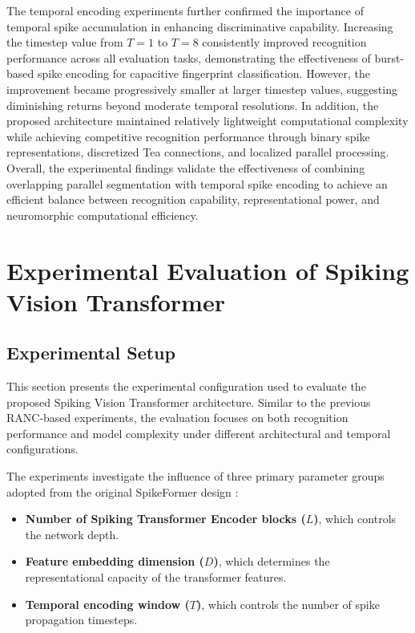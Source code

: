 \documentclass[../main.tex]{subfiles}
\begin{document}
The temporal encoding experiments further confirmed the importance of temporal spike accumulation in enhancing discriminative capability. Increasing the timestep value from \(T=1\) to \(T=8\) consistently improved recognition performance across all evaluation tasks, demonstrating the effectiveness of burst-based spike encoding for capacitive fingerprint classification. However, the improvement became progressively smaller at larger timestep values, suggesting diminishing returns beyond moderate temporal resolutions. In addition, the proposed architecture maintained relatively lightweight computational complexity while achieving competitive recognition performance through binary spike representations, discretized Tea connections, and localized parallel processing. Overall, the experimental findings validate the effectiveness of combining overlapping parallel segmentation with temporal spike encoding to achieve an efficient balance between recognition capability, representational power, and neuromorphic computational efficiency.

\section{Experimental Evaluation of Spiking Vision Transformer}

\subsection{Experimental Setup}

This section presents the experimental configuration used to evaluate the proposed Spiking Vision Transformer architecture. Similar to the previous RANC-based experiments, the evaluation focuses on both recognition performance and model complexity under different architectural and temporal configurations.

The experiments investigate the influence of three primary parameter groups adopted from the original SpikeFormer design \cite{zhou2023spikeformer}:

\begin{itemize}
    \item \textbf{Number of Spiking Transformer Encoder blocks (\(L\))}, which controls the network depth.
    
    \item \textbf{Feature embedding dimension (\(D\))}, which determines the representational capacity of the transformer features.
    
    \item \textbf{Temporal encoding window (\(T\))}, which controls the number of spike propagation timesteps.
\end{itemize}
\end{document}
